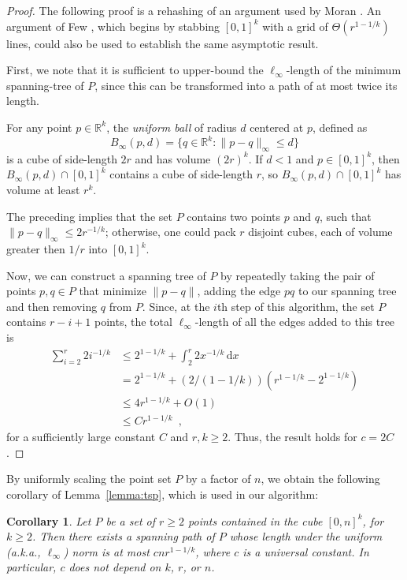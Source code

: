 \documentclass{patmorin}
\newtheorem{corollary}[theorem]{Corollary}
\newcommand{\R}{\mathbb{R}}
\begin{document}
\begin{proof}
The following proof is a rehashing of an argument used by Moran
\cite{moran:on}. An argument of Few \cite{few:shortest}, which begins
by stabbing $[0,1]^k$ with a grid of $\Theta(r^{1-1/k})$ lines, could
also be used to establish the same asymptotic result.

First, we note that it is sufficient to upper-bound the $\ell_\infty$-length of the minimum spanning-tree of $P$, since this
can be transformed into a path of at most twice its length.

For any point $p\in\R^k$, the \emph{uniform ball} of radius $d$ centered at $p$,
defined as
\[
    B_\infty(p,d)=\{q\in\R^k : \|p-q\|_\infty \le d\}
\]
is a cube of side-length $2r$ and has volume $(2r)^k$.  If $d< 1$ and
$p\in [0,1]^k$, then $B_\infty(p,d)\cap [0,1]^k$ contains a cube of side-length $r$, so $B_\infty(p,d)\cap [0,1]^k$ has volume at least $r^k$.  

The preceding implies that the set $P$ contains two points $p$ and $q$,
such that $\|p-q\|_\infty \le 2r^{-1/k}$; otherwise, one could pack $r$
disjoint cubes, each of volume greater then $1/r$ into $[0,1]^k$.

Now, we can construct a spanning tree of $P$ by repeatedly taking the
pair of points $p,q\in P$ that minimize $\|p-q\|$, adding the edge $pq$
to our spanning tree and then removing $q$ from $P$. Since, at the $i$th
step of this algorithm, the set $P$ contains $r-i+1$ points, the total $\ell_\infty$-length of all the edges added to this tree is
\begin{align*}
   \sum_{i=2}^{r} 2i^{-1/k} 
     & \le 2^{1-1/k} + \int_2^r 2x^{-1/k}\,\mathrm{d}x \\
     & = 2^{1-1/k} + (2/(1-1/k))\left(r^{1-1/k}-2^{1-1/k}\right) \\
     & \le 4r^{1-1/k} + O(1) \\
     & \le Cr^{1-1/k} \enspace ,
\end{align*}
for a sufficiently large constant $C$ and $r,k\ge 2$. Thus, the result holds for $c=2C$.
\end{proof}

By uniformly scaling the point set $P$ by a factor of $n$, we obtain the following corollary of Lemma~\ref{lemma:tsp}, which is used in our algorithm:

\begin{corollary}\label{cor:tsp}
  Let $P$ be a set of $r\ge 2$ points contained in the cube $[0,n]^k$,
  for $k\ge 2$.  Then there exists a spanning path of
  $P$ whose length under the uniform (a.k.a., $\ell_\infty$) norm is at
  most $cnr^{1-1/k}$, where $c$ is a universal constant. In particular,
  $c$ does not depend on $k$, $r$, or $n$.
\end{corollary}
\end{document}
